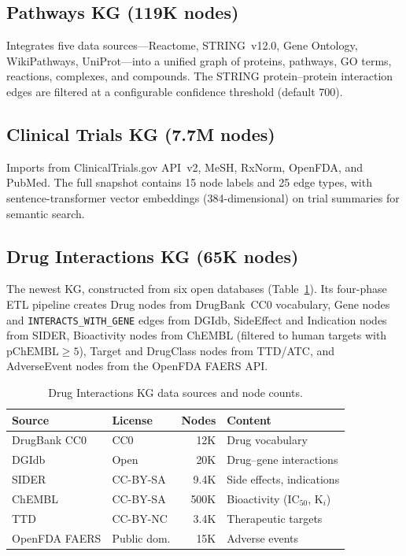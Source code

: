\documentclass[sigconf, anonymous, review]{acmart}
\begin{document}
\subsection{Pathways KG (119K nodes)}
Integrates five data sources---Reactome, STRING~v12.0, Gene Ontology,
WikiPathways, UniProt---into a unified graph of proteins, pathways,
GO terms, reactions, complexes, and compounds.  The STRING
protein--protein interaction edges are filtered at a configurable
confidence threshold (default 700).

\subsection{Clinical Trials KG (7.7M nodes)}
Imports from ClinicalTrials.gov API~v2, MeSH, RxNorm, OpenFDA, and
PubMed.  The full snapshot contains 15 node labels and 25 edge types,
with sentence-transformer vector embeddings (384-dimensional) on trial
summaries for semantic search.

\subsection{Drug Interactions KG (65K nodes)}
The newest KG, constructed from six open databases
(Table~\ref{tab:drugkg}).  Its four-phase ETL pipeline creates Drug
nodes from DrugBank~CC0 vocabulary, Gene nodes and
\texttt{INTERACTS\_WITH\_GENE} edges from DGIdb, SideEffect and
Indication nodes from SIDER, Bioactivity nodes from ChEMBL (filtered
to human targets with $\text{pChEMBL} \geq 5$), Target and DrugClass
nodes from TTD/ATC, and AdverseEvent nodes from the OpenFDA FAERS API.

\begin{table}[t]
\centering
\caption{Drug Interactions KG data sources and node counts.}
\label{tab:drugkg}
\small
\begin{tabular}{@{}llrl@{}}
\toprule
\textbf{Source} & \textbf{License} & \textbf{Nodes} & \textbf{Content} \\
\midrule
DrugBank CC0  & CC0         & 12K & Drug vocabulary \\
DGIdb         & Open        & 20K & Drug--gene interactions \\
SIDER         & CC-BY-SA    & 9.4K & Side effects, indications \\
ChEMBL        & CC-BY-SA    & 500K & Bioactivity (IC$_{50}$, K$_i$) \\
TTD           & CC-BY-NC    & 3.4K & Therapeutic targets \\
OpenFDA FAERS & Public dom. & 15K  & Adverse events \\
\bottomrule
\end{tabular}
\end{table}
\end{document}
